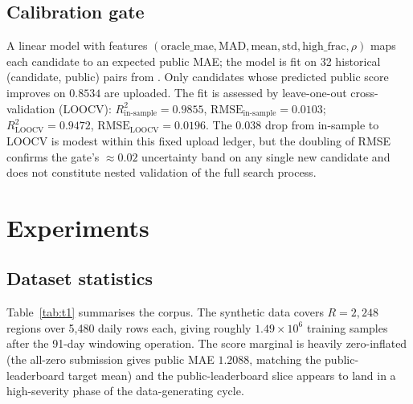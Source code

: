 \documentclass[conference,10pt,a4paper]{IEEEtran}
\begin{document}
\subsection{Calibration gate}
A linear model with features $(\mathrm{oracle\_mae},\mathrm{MAD},\mathrm{mean},\mathrm{std},\mathrm{high\_frac},\rho)$ maps each candidate to an expected public MAE; the model is fit on 32 historical (candidate, public) pairs from . Only candidates whose predicted public score improves on $0.8534$ are uploaded. The fit is assessed by leave-one-out cross-validation (LOOCV): $R^2_{\mathrm{in\text{-}sample}}=0.9855$, $\mathrm{RMSE}_{\mathrm{in\text{-}sample}}=0.0103$; $R^2_{\mathrm{LOOCV}}=0.9472$, $\mathrm{RMSE}_{\mathrm{LOOCV}}=0.0196$. The $0.038$ drop from in-sample to LOOCV is modest within this fixed upload ledger, but the doubling of RMSE confirms the gate's $\approx 0.02$ uncertainty band on any single new candidate and does not constitute nested validation of the full search process.

\section{Experiments}
\label{sec:experiments}

\subsection{Dataset statistics}
Table~\ref{tab:t1} summarises the corpus. The synthetic data covers $R=2{,}248$ regions over 5{,}480 daily rows each, giving roughly $1.49\times 10^{6}$ training samples after the 91-day windowing operation. The score marginal is heavily zero-inflated (the all-zero submission gives public MAE $1.2088$, matching the public-leaderboard target mean) and the public-leaderboard slice appears to land in a high-severity phase of the data-generating cycle.
\end{document}
